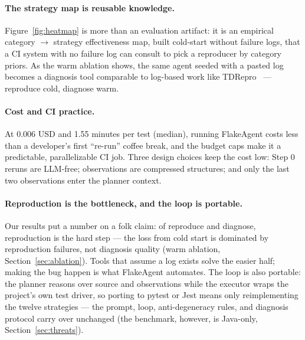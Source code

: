\paragraph{The strategy map is reusable knowledge.}
Figure~\ref{fig:heatmap} is more than an evaluation artifact: it is an
empirical category $\rightarrow$ strategy effectiveness map, built cold-start
without failure logs, that a CI system with no failure log can consult to
pick a reproducer by category priors. As the warm ablation shows, the same
agent seeded with a pasted log becomes a diagnosis tool comparable to
log-based work like TDRepro~\cite{chen2024tdrepro} — reproduce cold, diagnose
warm.

\paragraph{Cost and CI practice.}
At 0.006 USD and 1.55 minutes per test (median), running FlakeAgent costs
less than a developer's first ``re-run'' coffee break, and the budget caps
make it a predictable, parallelizable CI job. Three design choices keep the
cost low: Step 0 reruns are LLM-free; observations are compressed structures;
and only the last two observations enter the planner context.

\paragraph{Reproduction is the bottleneck, and the loop is portable.}
Our results put a number on a folk claim: of reproduce and diagnose,
reproduction is the hard step — the loss from cold start is dominated by
reproduction failures, not diagnosis quality (warm ablation,
Section~\ref{sec:ablation}). Tools that assume a log exists solve the easier
half; making the bug happen is what FlakeAgent automates. The loop is also
portable: the planner reasons over source and observations while the executor
wraps the project's own test driver, so porting to pytest or Jest means only
reimplementing the twelve strategies — the prompt, loop, anti-degeneracy
rules, and diagnosis protocol carry over unchanged (the benchmark, however,
is Java-only, Section~\ref{sec:threats}).
